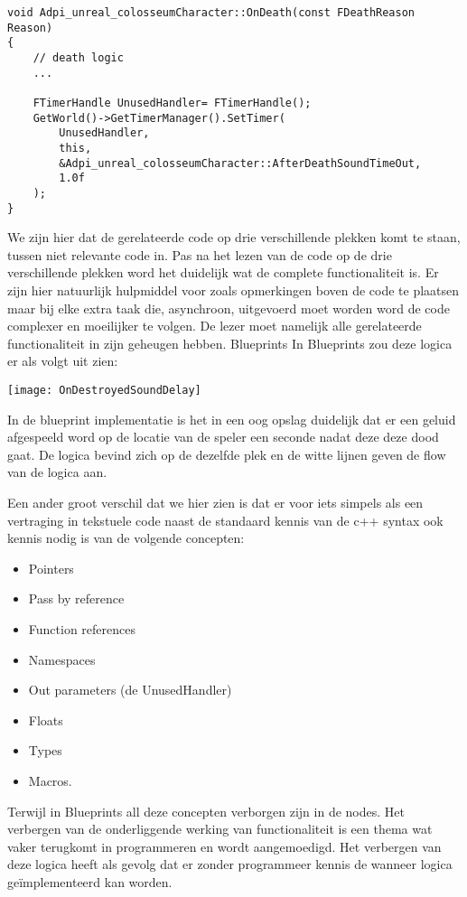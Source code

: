 \begin{lstlisting}
void Adpi_unreal_colosseumCharacter::OnDeath(const FDeathReason Reason)
{
	// death logic
	...

	FTimerHandle UnusedHandler= FTimerHandle();
	GetWorld()->GetTimerManager().SetTimer(
		UnusedHandler, 
		this, 
		&Adpi_unreal_colosseumCharacter::AfterDeathSoundTimeOut, 
		1.0f
	);
}
\end{lstlisting}

We zijn hier dat de gerelateerde code op drie verschillende plekken komt te staan, tussen niet relevante code in. Pas na het lezen van de code op de drie verschillende plekken word het duidelijk wat de complete functionaliteit is. Er zijn hier natuurlijk hulpmiddel voor zoals opmerkingen boven de code te plaatsen maar bij elke extra taak die, asynchroon, uitgevoerd moet worden word de code complexer en moeilijker te volgen. De lezer moet namelijk alle gerelateerde functionaliteit in zijn geheugen hebben.
Blueprints
In Blueprints zou deze logica er als volgt uit zien:

\texttt{[image: OnDestroyedSoundDelay]}

In de blueprint implementatie is het in een oog opslag duidelijk dat er een geluid afgespeeld word op de locatie van de speler een seconde nadat deze deze dood gaat. De logica bevind zich op de dezelfde plek en de witte lijnen geven de flow van de logica aan. 

Een ander groot verschil dat we hier zien is dat er voor iets simpels als een vertraging in tekstuele code naast de standaard kennis van de c++ syntax ook kennis nodig is van de volgende concepten:

\begin{itemize}
	\item Pointers
	\item Pass by reference
	\item Function references
	\item Namespaces
	\item Out parameters (de UnusedHandler)
	\item Floats
	\item Types
	\item Macros. 
\end{itemize}

Terwijl in Blueprints all deze concepten verborgen zijn in de nodes. Het verbergen van de onderliggende werking van functionaliteit is een thema wat vaker terugkomt in programmeren en wordt aangemoedigd. Het verbergen van deze logica heeft als gevolg dat er zonder programmeer kennis de wanneer logica geïmplementeerd kan worden.

